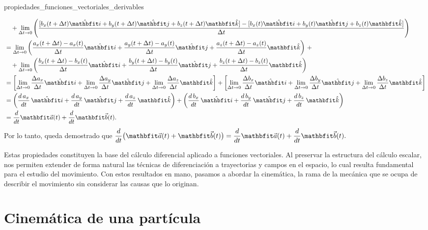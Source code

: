 \begin{theorem}{}{propiedades_funciones_vectoriales_derivables}
\begin{enumerate}[label=\textit{\roman*)}]
\begin{align*}
                    & \quad + \lim_{\Deltat \to 0} \left(\frac{[b_x(t + \Deltat)\veci + b_y(t + \Deltat)\vecj + b_z(t + \Deltat)\veck] - [b_x(t)\veci + b_y(t)\vecj + b_z(t)\veck]}{\Deltat}\right) \\
                    & = \lim_{\Deltat \to 0} \left(\frac{a_x(t + \Deltat) - a_x(t)}{\Deltat}\veci + \frac{a_y(t + \Deltat) - a_y(t)}{\Deltat}\vecj + \frac{a_z(t + \Deltat) - a_z(t)}{\Deltat}\veck\right) \, + \\
                    & \quad + \lim_{\Deltat \to 0} \left(\frac{b_x(t + \Deltat) - b_x(t)}{\Deltat}\veci + \frac{b_y(t + \Deltat) - b_y(t)}{\Deltat}\vecj + \frac{b_z(t + \Deltat) - b_z(t)}{\Deltat}\veck\right) \\
                    & = \left[\lim_{\Deltat \to 0} \frac{\Deltaax}{\Deltat}\veci + \lim_{\Deltat \to 0} \frac{\Deltaay}{\Deltat}\vecj + \lim_{\Deltat \to 0} \frac{\Deltaaz}{\Deltat}\veck\right] + \left[\lim_{\Deltat \to 0} \frac{\Deltabx}{\Deltat}\veci + \lim_{\Deltat \to 0} \frac{\Deltaby}{\Deltat}\vecj + \lim_{\Deltat \to 0} \frac{\Deltabz}{\Deltat}\veck\right] \\
                    & = \left(\frac{d\,a_x}{dt}\,\veci + \frac{d\,a_y}{dt}\,\vecj + \frac{d\,a_z}{dt}\,\veck\right) + \left(\frac{d\,b_x}{dt}\,\veci + \frac{d\,b_y}{dt}\,\vecj + \frac{d\,b_z}{dt}\,\veck\right) \\
                    & = \frac{d}{dt}\veca(t) + \frac{d}{dt}\vecb(t).
                \end{align*}
        Por lo tanto, queda demostrado que $\dfrac{d}{dt} \bigl(\veca(t) + \vecb(t)\bigr) = \dfrac{d}{dt}\veca(t) + \dfrac{d}{dt}\vecb(t).$ \hfill \BlackSquare
    \end{enumerate}
\end{theorem}

Estas propiedades constituyen la base del cálculo diferencial aplicado a funciones vectoriales. Al preservar la estructura del cálculo escalar, nos permiten extender de forma natural las técnicas de diferenciación a trayectorias y campos en el espacio, lo cual resulta fundamental para el estudio del movimiento. Con estos resultados en mano, pasamos a abordar la cinemática, la rama de la mecánica que se ocupa de describir el movimiento sin considerar las causas que lo originan.

\section{Cinemática de una partícula}

